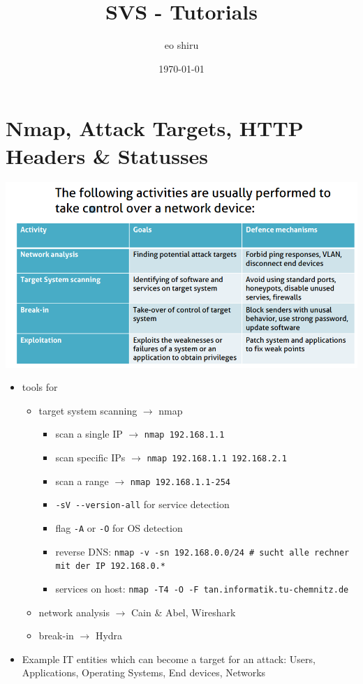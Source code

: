 \documentclass[11pt]{article}
\author{eo shiru}
\date{\today}
\title{SVS - Tutorials}
\begin{document}
\maketitle
\tableofcontents

\section{Nmap, Attack Targets, HTTP Headers \& Statusses}
\label{sec:org4d0b49b}
\begin{center}
\includegraphics[width=.9\linewidth]{./F7.png}
\end{center}
\begin{itemize}
\item tools for 
\begin{itemize}
\item target system scanning \(\rightarrow\) nmap
\begin{itemize}
\item scan a single IP \(\rightarrow\) \texttt{nmap 192.168.1.1}
\item scan specific IPs \(\rightarrow\) \texttt{nmap 192.168.1.1 192.168.2.1}
\item scan a range \(\rightarrow\) \texttt{nmap 192.168.1.1-254}
\item \texttt{-sV -{}-version-all} for service detection
\item flag \texttt{-A} or \texttt{-O} for OS detection
\item reverse DNS: \texttt{nmap -v -sn 192.168.0.0/24 \# sucht alle rechner mit der IP 192.168.0.*}
\item services on host: \texttt{nmap -T4 -O -F tan.informatik.tu-chemnitz.de}
\end{itemize}
\item network analysis \(\rightarrow\) Cain \& Abel, Wireshark
\item break-in \(\rightarrow\) Hydra
\end{itemize}
\item Example IT entities which can become a target for an attack: Users, Applications, Operating Systems, End devices, Networks
\end{itemize}
\end{document}
